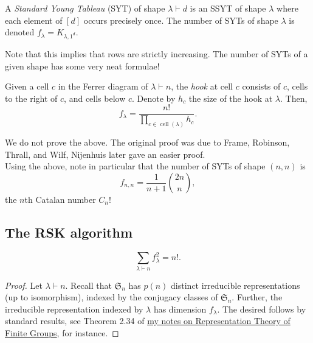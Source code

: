 	\begin{fdef}
		A \emph{Standard Young Tableau} (SYT) of shape $\lambda\vdash d$ is an SSYT of shape $\lambda$ where each element of $[d]$ occurs precisely once. The number of SYTs of shape $\lambda$ is denoted $f_\lambda = K_{\lambda,1^d}$.
	\end{fdef}
	Note that this implies that rows are strictly increasing. The number of SYTs of a given shape has some very neat formulae!

	\begin{ftheo}
		Given a cell $c$ in the Ferrer diagram of $\lambda \vdash n$, the \emph{hook} at cell $c$ consists of $c$, cells to the right of $c$, and cells below $c$. Denote by $h_c$ the size of the hook at $\lambda$. Then,
		\[ f_\lambda = \frac{n!}{\prod_{c \in \operatorname{cell}(\lambda)} h_c}. \]
	\end{ftheo}
	We do not prove the above. The original proof was due to Frame, Robinson, Thrall, and Wilf, Nijenhuis later gave an easier proof.\\
	Using the above, note in particular that the number of SYTs of shape $(n,n)$ is
	\[ f_{n,n} = \frac{1}{n+1} \binom{2n}{n}, \]
	the $n$th Catalan number $C_n$!

\subsection{The RSK algorithm}

	\begin{ftheo}
		\[ \sum_{\lambda \vdash n} f_\lambda^2 = n!. \]
	\end{ftheo}
	\begin{proof}
		Let $\lambda \vdash n$. Recall that $\mathfrak{S}_n$ has $p(n)$ distinct irreducible representations (up to isomorphism), indexed by the conjugacy classes of $\mathfrak{S}_n$. Further, the irreducible representation indexed by $\lambda$ has dimension $f_\lambda$. The desired follows by standard results, see Theorem 2.34 of \href{https://amitrajaraman.github.io/notes/rep-th/main.pdf}{my notes on Representation Theory of Finite Groups}, for instance.
	\end{proof}



